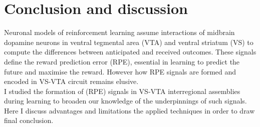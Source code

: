 \chapter{Conclusion and discussion}
\label{chap:Conclusion}
Neuronal models of reinforcement learning assume interactions of midbrain dopamine neurons in ventral tegmental area (VTA) and ventral striatum (VS) to compute the differences between anticipated and received outcomes. These signals define the reward prediction error (RPE), essential in learning to predict the future and maximise the reward. However how RPE signals are formed and encoded in VS-VTA circuit remains elusive.\\I studied the formation of (RPE) signals in VS-VTA interregional assemblies during learning to broaden our knowledge of the underpinnings of such signals. Here I discuss advantages and limitations the applied techniques in order to draw final conclusion.
